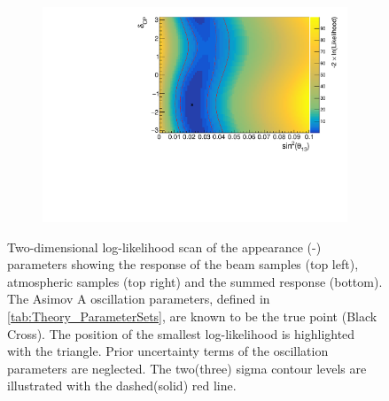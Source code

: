 \begin{figure}[h]
\begin{subfigure}[t]{1.0\textwidth}
    \includegraphics[width=\textwidth, trim={0mm 0mm 0mm 0mm}, clip,page=3]{Figures/OA/AppearanceScans.pdf}
  \end{subfigure}
  \caption{Two-dimensional log-likelihood scan of the appearance (-) parameters showing the response of the beam samples (top left), atmospheric samples (top right) and the summed response (bottom). The Asimov A oscillation parameters, defined in \autoref{tab:Theory_ParameterSets}, are known to be the true point (Black Cross). The position of the smallest log-likelihood is highlighted with the triangle. Prior uncertainty terms of the oscillation parameters are neglected. The two(three) sigma contour levels are illustrated with the dashed(solid) red line.}
  \label{fig:OscillationAnalysis_2DLLHOscScans_App}
\end{figure}


